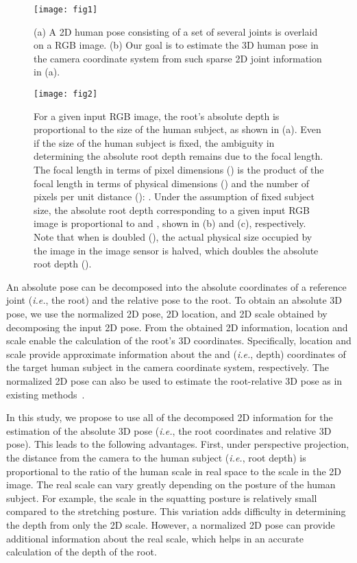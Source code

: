 \documentclass[10pt,twocolumn,letterpaper]{article}
\begin{document}
\begin{figure}
\centering
\texttt{[image: fig1]}
\caption{(a) A 2D human pose consisting of a set of several joints is overlaid on a RGB image. (b) Our goal is to estimate the 3D human pose in the camera coordinate system from such sparse 2D joint information in (a).}
\label{fig1}
\end{figure}

\begin{figure*}[t]
\centering
\texttt{[image: fig2]}
\caption{For a given input RGB image, the root's absolute depth is proportional to the size of the human subject, as shown in (a). Even if the size of the human subject is fixed, the ambiguity in determining the absolute root depth remains due to the focal length. The focal length in terms of pixel dimensions () is the product of the focal length in terms of physical dimensions () and the number of pixels per unit distance (): . Under the assumption of fixed subject size, the absolute root depth corresponding to a given input RGB image is proportional to  and , shown in (b) and (c), respectively. Note that when  is doubled (), the actual physical size occupied by the image in the image sensor is halved, which doubles the absolute root depth ().}
\label{fig2}
\end{figure*}

An absolute pose can be decomposed into the absolute coordinates of a reference joint (\textit{i.e.}, the root) and the relative pose to the root. To obtain an absolute 3D pose, we use the normalized 2D pose, 2D location, and 2D scale obtained by decomposing the input 2D pose. From the obtained 2D information, location and scale enable the calculation of the root's 3D coordinates. Specifically, location and scale provide approximate information about the  and  (\textit{i.e.}, depth) coordinates of the target human subject in the camera coordinate system, respectively. The normalized 2D pose can also be used to estimate the root-relative 3D pose as in existing methods~\cite{Martinez2017}.

In this study, we propose to use all of the decomposed 2D information for the estimation of the absolute 3D pose (\textit{i.e.}, the root coordinates and relative 3D pose). This leads to the following advantages. First, under perspective projection, the distance from the camera to the human subject (\textit{i.e.}, root depth) is proportional to the ratio of the human scale in real space to the scale in the 2D image. The real scale can vary greatly depending on the posture of the human subject. For example, the scale in the squatting posture is relatively small compared to the stretching posture. This variation adds difficulty in determining the depth from only the 2D scale. However, a normalized 2D pose can provide additional information about the real scale, which helps in an accurate calculation of the depth of the root.
\end{document}
